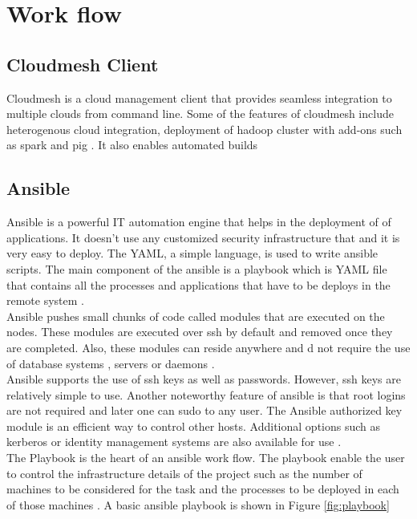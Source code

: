 \documentclass[9pt,twocolumn,twoside]{styles/osajnl}
\begin{document}
\section{Work flow}

\subsection{Cloudmesh Client}
Cloudmesh is a cloud management client that provides seamless integration to multiple clouds from command line. Some of the features of cloudmesh include heterogenous cloud integration, deployment of hadoop cluster with add-ons such as spark and pig \cite{www-cm-git}. It also enables automated builds 

\subsection{Ansible}
Ansible is a powerful IT automation engine that helps in the deployment of of applications. It doesn't use any customized security infrastructure that and it is very easy to deploy. The YAML, a simple language, is used to write ansible scripts. The main component of the ansible is a playbook which is YAML file that contains all the processes and applications that have to be deploys in the remote system \cite{www-ansible}. \\
Ansible pushes small chunks of code called modules that are executed on the nodes. These modules are executed over ssh by default and removed once they are completed. Also, these modules can reside anywhere and d not require the use of database systems , servers or daemons \cite{www-ansible}.\\
Ansible supports the use of ssh keys as well as passwords. However, ssh keys are relatively simple to use. Another noteworthy feature of ansible is that root logins are not required and later one can sudo to any user. The Ansible authorized key module is an efficient way to control other hosts. Additional options such as kerberos or identity management systems are also available for use \cite{www-ansible}. \\
The Playbook is the heart of an ansible work flow. The playbook enable the user to control the infrastructure details of the project such as the number of machines to be considered for the task and the processes to be deployed in each of those machines \cite{www-ansible}. A basic ansible playbook is shown in Figure \ref{fig:playbook} 
\end{document}

